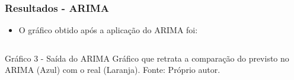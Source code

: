 \documentclass[aspectratio=169]{beamer}
\begin{document}
	
		\begin{frame}[fragile]
			\frametitle{Resultados - ARIMA}
		
			\begin{itemize} 
				\item O gráfico obtido após a aplicação do ARIMA foi:
			\end{itemize}
		
				\begin{columns}[c]
					\begin{column}{1\linewidth}
						\begin{figure}
							\label{fig:arima}
						\end{figure}
		
						\begin{block}{Gráfico 3 - Saída do ARIMA}
							Gráfico que retrata a comparação do previsto no ARIMA (Azul) com o real (Laranja). \newline Fonte: Próprio autor.    
						\end{block}
					\end{column}
				\end{columns}
			\end{frame}
\end{document}
